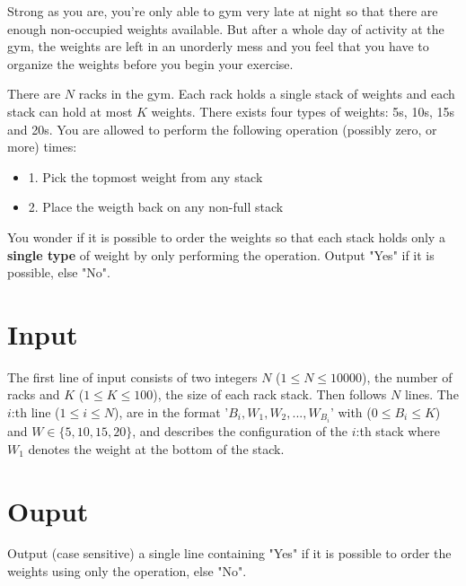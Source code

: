 

Strong as you are, you're only able to gym very late at night so that there are enough non-occupied weights available. 
But after a whole day of activity at the gym, the weights are left in an unorderly mess and you feel that you have to organize the weights before you begin your exercise.

There are $N$ racks in the gym. Each rack holds a single stack of weights and each stack can hold at most $K$ weights. 
There exists four types of weights: 5s, 10s, 15s and 20s. You are allowed to perform the following operation (possibly zero, or more) times:

\begin{itemize}
    \item{1. Pick the topmost weight from any stack}
    \item{2. Place the weigth back on any non-full stack}
\end{itemize}


You wonder if it is possible to order the weights so that each stack holds only a \textbf{single type} of weight by only performing the operation. Output "Yes" if it is possible, else "No".

\section*{Input}
The first line of input consists of two integers $N$ ($1 \leq N \leq 10000$), the number of racks and $K$ ($1 \leq K \leq 100$), the size of each rack stack. Then follows $N$ lines. The $i$:th line ($1 \leq i \leq N$), are in the format '$B_i, W_1, W_2, ..., W_{B_i}$' with ($0 \leq B_i \leq K$) and $W \in \{5,10,15,20\}$, and describes the configuration of the $i$:th stack where $W_1$ denotes the weight at the bottom of the stack.
\section*{Ouput}
Output (case sensitive) a single line containing "Yes" if it is possible to order the weights using only the operation, else "No".